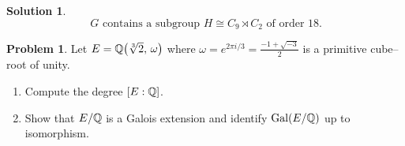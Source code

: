 \documentclass[12pt]{article}
\DeclareMathOperator{\Gal}{Gal}
\theoremstyle{definition} %
\newtheorem{solution}{Solution}
\newtheorem{problem}{Problem}
\theoremstyle{plain} %
\begin{document}
\begin{solution}
        \[
           \boxed{\,G \text{ contains a subgroup }H\cong C_{9}\rtimes C_{2}
                  \text{ of order }18.}
        \]
        
        \end{solution}
        \begin{problem}
          Let \(E=\Bbb Q\bigl(\sqrt[3]{2},\,\omega\bigr)\) where
          \(\displaystyle \omega=e^{2\pi i/3}=\tfrac{-1+\sqrt{-3}}{2}\) is a
          primitive cube–root of unity.
          \begin{enumerate}[]
             \item Compute the degree \([E:\Bbb Q]\).
             \item Show that \(E/\Bbb Q\) is a Galois extension and identify
                   \(\Gal(E/\Bbb Q)\) up to isomorphism.
          \end{enumerate}
          \end{problem}
          
\end{document}
